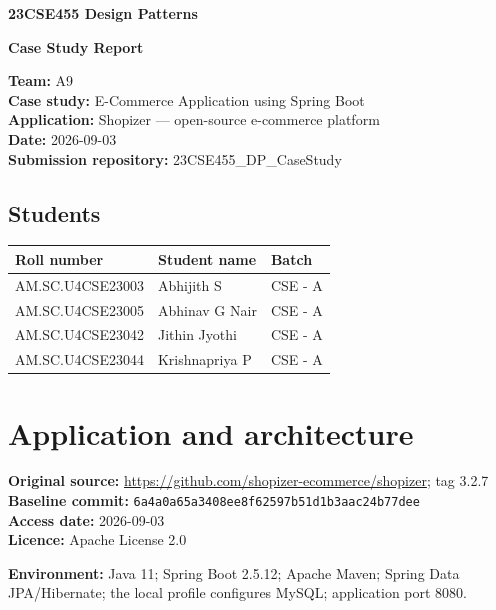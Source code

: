 \documentclass[11pt,a4paper]{article}
\newcommand{\tsmall}{\small\setlength{\tabcolsep}{3pt}}
\begin{document}
\begin{center}
  {\LARGE\bfseries 23CSE455 Design Patterns\par}
  \vspace{0.3cm}
  {\Large\bfseries Case Study Report\par}
\end{center}

\textbf{Team:} A9\\
\textbf{Case study:} E-Commerce Application using Spring Boot\\
\textbf{Application:} Shopizer --- open-source e-commerce platform\\
\textbf{Date:} 2026-09-03\\
\textbf{Submission repository:} 23CSE455\_DP\_CaseStudy

\subsection*{Students}
\begin{center}
\tsmall
\begin{tabular}{@{}lll@{}}
\toprule
\textbf{Roll number} & \textbf{Student name} & \textbf{Batch}\\
\midrule
AM.SC.U4CSE23003 & Abhijith S & CSE - A\\
AM.SC.U4CSE23005 & Abhinav G Nair & CSE - A\\
AM.SC.U4CSE23042 & Jithin Jyothi & CSE - A\\
AM.SC.U4CSE23044 & Krishnapriya P & CSE - A\\
\bottomrule
\end{tabular}
\end{center}

\section{Application and architecture}

\textbf{Original source:} \url{https://github.com/shopizer-ecommerce/shopizer}; tag 3.2.7\\
\textbf{Baseline commit:} \texttt{6a4a0a65a3408ee8f62597b51d1b3aac24b77dee}\\
\textbf{Access date:} 2026-09-03\\
\textbf{Licence:} Apache License 2.0

\textbf{Environment:} Java 11; Spring Boot 2.5.12; Apache Maven; Spring Data JPA/Hibernate; the local profile configures MySQL; application port 8080.
\end{document}
